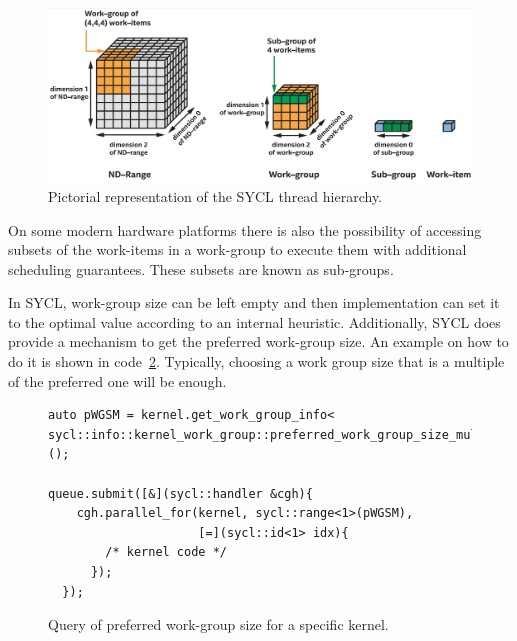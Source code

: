 \begin{figure}[ht!]
    \centering
    \includegraphics[width=\textwidth]{media/sycl_nd_range.png}
    \caption{Pictorial representation of the SYCL thread hierarchy.}
    \label{fig:sycl_nd_range}
\end{figure}

On some modern hardware platforms there is also the possibility of accessing subsets of the work-items in a
work-group to execute them with additional scheduling guarantees. These subsets are known as sub-groups. 

In SYCL, work-group size can be left empty and then implementation can set it to the optimal value according to an internal heuristic. Additionally, SYCL does provide a mechanism to get the preferred work-group size. An example on how to do it is shown in code~\ref{code:work_group_size}. Typically, choosing a work group size that is a multiple of the preferred one will be enough.

\begin{figure}[ht!]
\renewcommand{\figurename}{Code}
\begin{verbatim}
auto pWGSM = kernel.get_work_group_info<
sycl::info::kernel_work_group::preferred_work_group_size_multiple>();

queue.submit([&](sycl::handler &cgh){
    cgh.parallel_for(kernel, sycl::range<1>(pWGSM), 
                     [=](sycl::id<1> idx){
        /* kernel code */
      });
  });
\end{verbatim}
\caption{Query of preferred work-group size for a specific kernel.}
\label{code:work_group_size}
\end{figure}

